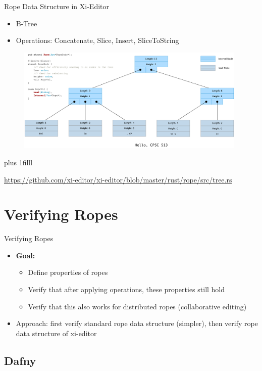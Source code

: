 \documentclass{beamer}
\newcommand{\btVFill}{\vskip0pt plus 1filll}
\begin{document}
\begin{frame}{Rope Data Structure in Xi-Editor}
  \begin{itemize}
      \item B-Tree
      \item Operations: Concatenate, Slice, Insert, SliceToString
  \end{itemize}
  \begin{figure}
      \centering
      \includegraphics[width=11cm]{images/xi-rope.png}
  \end{figure}

  \btVFill

  \tiny{\url{https://github.com/xi-editor/xi-editor/blob/master/rust/rope/src/tree.rs}}
  \smallskip
\end{frame}


\section{Verifying Ropes}

\begin{frame}{Verifying Ropes}
  \begin{itemize}
      \item \textbf{Goal:}
        \begin{itemize}
          \item Define properties of ropes
          \item Verify that after applying operations, these properties still hold
          \item Verify that this also works for distributed ropes (collaborative editing)
        \end{itemize}
      \item Approach: first verify standard rope data structure (simpler), then verify rope data structure of xi-editor
  \end{itemize}
\end{frame}

\subsection{Dafny}
\end{document}
